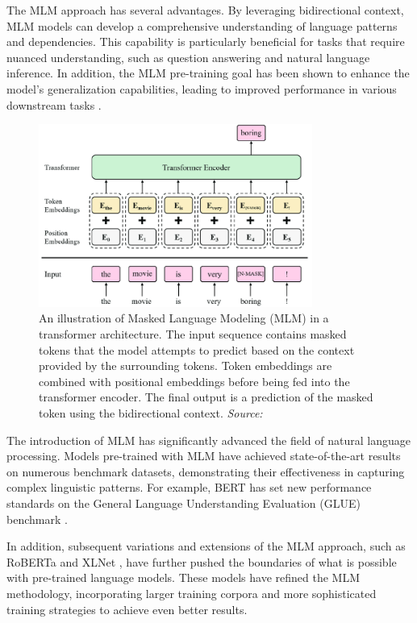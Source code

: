 The MLM approach has several advantages. By leveraging bidirectional context, MLM models can develop a comprehensive understanding of language patterns and dependencies. This capability is particularly beneficial for tasks that require nuanced understanding, such as question answering and natural language inference. In addition, the MLM pre-training goal has been shown to enhance the model's generalization capabilities, leading to improved performance in various downstream tasks \cite{yang2019xlnet}.

\begin{figure}[h]
    \centering
    \includegraphics[width=0.8\textwidth]{images/llms/Model-structure-of-the-label-masked-language-model-N-MASK-is-a-mask-token-containing.png}
    \caption{An illustration of Masked Language Modeling (MLM) in a transformer architecture. The input sequence contains masked tokens that the model attempts to predict based on the context provided by the surrounding tokens. Token embeddings are combined with positional embeddings before being fed into the transformer encoder. The final output is a prediction of the masked token using the bidirectional context. \textit{Source:} \cite{park2019}}
    \label{fig:mlm_architecture}
\end{figure}

The introduction of MLM has significantly advanced the field of natural language processing. Models pre-trained with MLM have achieved state-of-the-art results on numerous benchmark datasets, demonstrating their effectiveness in capturing complex linguistic patterns. For example, BERT has set new performance standards on the General Language Understanding Evaluation (GLUE) benchmark \cite{wang2018glue}.

In addition, subsequent variations and extensions of the MLM approach, such as RoBERTa \cite{liu2019roberta} and XLNet \cite{yang2019xlnet}, have further pushed the boundaries of what is possible with pre-trained language models. These models have refined the MLM methodology, incorporating larger training corpora and more sophisticated training strategies to achieve even better results.

